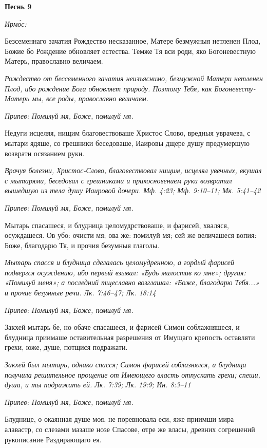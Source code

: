 \bfseries Песнь 9\normalfont{}


\itshape Ирмо́с:\normalfont{}


Безсеменнаго зачатия Рождество несказанное, Матере безмужныя нетленен Плод, Божие бо Рождение обновляет естества. Темже Тя вси роди, яко Богоневестную Матерь, православно величаем.


\itshape Рождество от бессеменного зачатия неизъяснимо, безмужной Матери нетленен Плод, ибо рождение Бога обновляет природу. Поэтому Тебя, как Богоневесту-Матерь мы, все роды, православно величаем.\normalfont{}


\itshape Припев:\normalfont{} Помилуй мя, Боже, помилуй мя.


Недуги исцеляя, нищим благовествоваше Христос Слово, вредныя уврачева, с мытари ядяше, со грешники беседоваше, Иаировы дщере душу предумершую возврати осязанием руки.


\itshape Врачуя болезни, Христос-Слово, благовествовал нищим, исцелял увечных, вкушал с мытарями, беседовал с грешниками и прикосновением руки возвратил вышедшую из тела душу Иаировой дочери. Мф. 4:23; Мф. 9:10–11; Мк. 5:41–42\normalfont{}


\itshape Припев:\normalfont{} Помилуй мя, Боже, помилуй мя.


Мытарь спасашеся, и блудница целомудрствоваше, и фарисей, хваляся, осуждашеся. Ов убо: очисти мя; ова же: помилуй мя; сей же величашеся вопия: Боже, благодарю Тя, и прочия безумныя глаголы.


\itshape Мытарь спасся и блудница сделалась целомудренною, а гордый фарисей подвергся осуждению, ибо первый взывал: «Будь милостив ко мне»; другая: «Помилуй меня»; а последний тщеславно возглашал: «Боже, благодарю Тебя...» и прочие безумные речи. Лк. 7:46–47; Лк. 18:14\normalfont{}


\itshape Припев:\normalfont{} Помилуй мя, Боже, помилуй мя.


Закхей мытарь бе, но обаче спасашеся, и фарисей Симон соблажняшеся, и блудница приимаше оставительная разрешения от Имущаго крепость оставляти грехи, юже, душе, потщися подражати.


\itshape Закхей был мытарь, однако спасся; Симон фарисей соблазнялся, а блудница получила решительное прощение от Имеющего власть отпускать грехи; спеши, душа, и ты подражать ей. Лк. 7:39; Лк. 19:9; Ин. 8:3–11\normalfont{}


\itshape Припев:\normalfont{} Помилуй мя, Боже, помилуй мя.


Блуднице, о окаянная душе моя, не поревновала еси, яже приимши мира алавастр, со слезами мазаше нозе Спасове, отре же власы, древних согрешений рукописание Раздирающаго ея.



